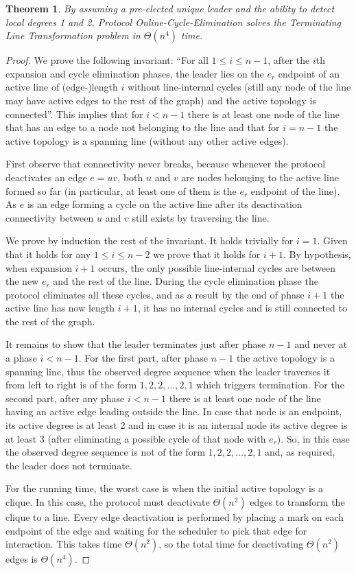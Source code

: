 \documentclass[preprint]{elsarticle}
\newtheorem{theorem}{Theorem}
\begin{document}
\begin{theorem}
By assuming a pre-elected unique leader and the ability to detect local degrees 1 and 2, Protocol Online-Cycle-Elimination solves the Terminating Line Transformation problem in $\Theta(n^4)$ time.
\end{theorem}
\begin{proof}
We prove the following invariant: ``For all $1\leq i\leq n-1$, after the $i$th expansion and cycle elimination phases, the leader lies on the $e_r$ endpoint of an active line of (edge-)length $i$ without line-internal cycles (still any node of the line may have active edges to the rest of the graph) and the active topology is connected''. This implies that for $i<n-1$ there is at least one node of the line that has an edge to a node not belonging to the line and that for $i=n-1$ the active topology is a spanning line (without any other active edges). 

First observe that connectivity never breaks, because whenever the protocol deactivates an edge $e=uv$, both $u$ and $v$ are nodes belonging to the active line formed so far (in particular, at least one of them is the $e_r$ endpoint of the line). As $e$ is an edge forming a cycle on the active line after its deactivation connectivity between $u$ and $v$ still exists by traversing the line.

We prove by induction the rest of the invariant. It holds trivially for $i=1$. Given that it holds for any $1\leq i\leq n-2$ we prove that it holds for $i+1$. By hypothesis, when expansion $i+1$ occurs, the only possible line-internal cycles are between the new $e_r$ and the rest of the line. During the cycle elimination phase the protocol eliminates all these cycles, and as a result by the end of phase $i+1$ the active line has now length $i+1$, it has no internal cycles and is still connected to the rest of the graph. 

It remains to show that the leader terminates just after phase $n-1$ and never at a phase $i<n-1$. For the first part, after phase $n-1$ the active topology is a spanning line, thus the observed degree sequence when the leader traverses it from left to right is of the form $1,2,2,\ldots,2,1$ which triggers termination. For the second part, after any phase $i<n-1$ there is at least one node of the line having an active edge leading outside the line. In case that node is an endpoint, its active degree is at least 2 and in case it is an internal node its active degree is at least 3 (after eliminating a possible cycle of that node with $e_r$). So, in this case the observed degree sequence is not of the form $1,2,2,\ldots,2,1$ and, as required, the leader does not terminate.

For the running time, the worst case is when the initial active topology is a clique. In this case, the protocol must deactivate $\Theta(n^2)$ edges to transform the clique to a line. Every edge deactivation is performed by placing a mark on each endpoint of the edge and waiting for the scheduler to pick that edge for interaction. This takes time $\Theta(n^2)$, so the total time for deactivating $\Theta(n^2)$ edges is $\Theta(n^4)$.
\end{proof}
\end{document}
